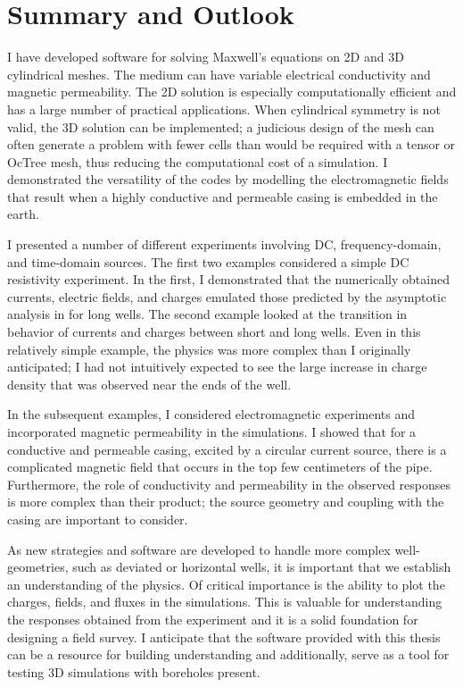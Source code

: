 \section{Summary and Outlook}

I have developed software for solving Maxwell’s equations on 2D and 3D cylindrical meshes. The medium can have variable electrical conductivity and magnetic permeability. The 2D solution is especially computationally efficient and has a large number of practical applications. When cylindrical symmetry is not valid, the 3D solution can be implemented; a judicious design of the mesh can often generate a problem with fewer cells than would be required with a tensor or OcTree mesh, thus reducing the computational cost of a simulation. I demonstrated the versatility of the codes by modelling the electromagnetic fields that result when a highly conductive and permeable casing is embedded in the earth.

I presented a number of different experiments involving DC, frequency-domain, and time-domain sources. The first two examples considered a simple DC resistivity experiment. In the first, I demonstrated that the numerically obtained currents, electric fields, and charges emulated those predicted by the asymptotic analysis in \cite{Kaufman1990} for long wells. The second example looked at the transition in behavior of currents and charges between short and long wells. Even in this relatively simple example, the physics was more complex than I originally anticipated; I had not intuitively expected to see the large increase in charge density that was observed near the ends of the well.

In the subsequent examples, I considered electromagnetic experiments and incorporated magnetic permeability in the simulations. I showed that for a conductive and permeable casing, excited by a circular current source, there is a complicated magnetic field that occurs in the top few centimeters of the pipe. Furthermore, the role of conductivity and permeability in the observed responses is more complex than their product; the source geometry and coupling with the casing are important to consider.

As new strategies and software are developed to handle more complex well-geometries, such as deviated or horizontal wells, it is important that we establish an understanding of the physics. Of critical importance is the ability to plot the charges, fields, and fluxes in the simulations. This is valuable for understanding the responses obtained from the experiment and it is a solid foundation for designing a field survey. I anticipate that the software provided with this thesis can be a resource for building understanding and additionally, serve as a tool for testing 3D simulations with boreholes present.

